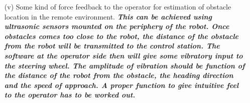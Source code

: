 \begin{itemize}
	
	\item [(v)] Some kind of force feedback to the operator for estimation of obstacle location in the remote environment.  \textbf{\textit{This can be achieved using ultrasonic sensors mounted on the periphery of the robot. Once obstacles comes too close to the robot, the distance of the obstacle from the robot will be transmitted to the control station. The software at the operator side then will give some vibratory input to the steering wheel. The amplitude of vibration should be function of the distance of the robot from the obstacle, the heading direction and the speed of approach. A proper function to give intuitive feel to the operator has to be worked out.}}
\end{itemize}	
